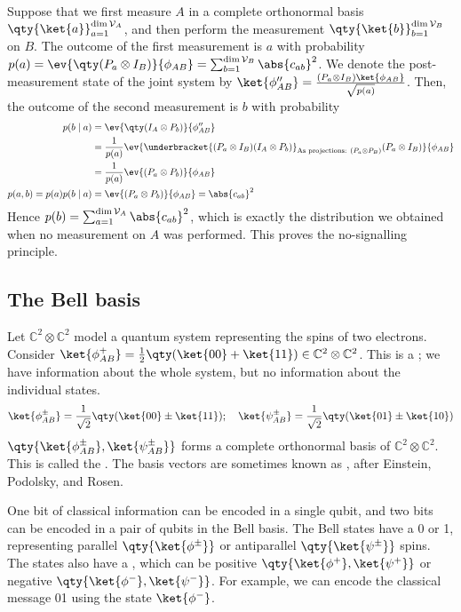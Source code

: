 Suppose that we first measure $A$ in a complete orthonormal basis $\qty{\ket{a}}_{a=1}^{\dim \mathcal V_A}$, and then perform the measurement $\qty{\ket{b}}_{b=1}^{\dim \mathcal V_B}$ on $B$.
The outcome of the first measurement is $a$ with probability $p(a) = \ev{\qty(P_a \otimes I_B)}{\phi_{AB}} = \sum_{b=1}^{\dim \mathcal V_B} \abs{c_{ab}}^2$.
We denote the post-measurement state of the joint system by $\ket{\phi_{AB}''}= \frac{(P_a \otimes I_B) \ket{\phi_{AB}}}{\sqrt{p(a)}}$.
Then, the outcome of the second measurement is $b$ with probability
\begin{align*}
    p(b \mid a) &= \ev{\qty(I_A \otimes P_b)}{\phi_{AB}''} \\
    &= \frac{1}{p(a)} \ev{\underbracket{(P_a \otimes I_B) (I_A \otimes P_b)}_{\text{As projections: } (P_a \otimes P_B)} (P_a \otimes I_B)}{\phi_{AB}} \\
    &= \frac{1}{p(a)} \ev{(P_a \otimes P_b)}{\phi_{AB}} \\
    p(a,b) = p(a) p(b \mid a) &= \ev{(P_a \otimes P_b)}{\phi_{AB}} = \abs{c_{ab}}^2
\end{align*}
Hence $p(b) = \sum_{a=1}^{\dim \mathcal V_A} \abs{c_{ab}}^2$, which is exactly the distribution we obtained when no measurement on $A$ was performed.
This proves the no-signalling principle.

\subsection{The Bell basis}
Let $\mathbb C^2 \otimes \mathbb C^2$ model a quantum system representing the spins of two electrons.
Consider $\ket{\phi_{AB}^+} = \frac{1}{2}\qty(\ket{00} + \ket{11}) \in \mathbb C^2 \otimes \mathbb C^2$.
This is a ; we have information about the whole system, but no information about the individual states.
\[ \ket{\phi_{AB}^\pm} = \frac{1}{\sqrt{2}} \qty(\ket{00} \pm \ket{11});\quad \ket{\psi_{AB}^\pm} = \frac{1}{\sqrt{2}} \qty(\ket{01} \pm \ket{10}) \]
$\qty{\ket{\phi_{AB}^\pm}, \ket{\psi_{AB}^\pm}}$ forms a complete orthonormal basis of $\mathbb C^2 \otimes \mathbb C^2$.
This is called the .
The basis vectors are sometimes known as , after Einstein, Podolsky, and Rosen.

One bit of classical information can be encoded in a single qubit, and two bits can be encoded in a pair of qubits in the Bell basis.
The Bell states have a  0 or 1, representing parallel $\qty{\ket{\phi^\pm}}$ or antiparallel $\qty{\ket{\psi^\pm}}$ spins.
The states also have a , which can be positive $\qty{\ket{\phi^+}, \ket{\psi^+}}$ or negative $\qty{\ket{\phi^-}, \ket{\psi^-}}$.
For example, we can encode the classical message 01 using the state $\ket{\phi^-}$.

